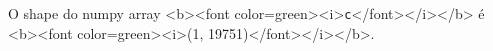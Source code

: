 \documentclass[12pt,varwidth=16cm,border=1pt]{standalone}
\begin{document}
O shape do numpy array <b><font color=green><i>\verb+c+</font></i></b> é <b><font color=green><i>(1, 19751)</font></i></b>.

\questiomfalse
\end{document}
